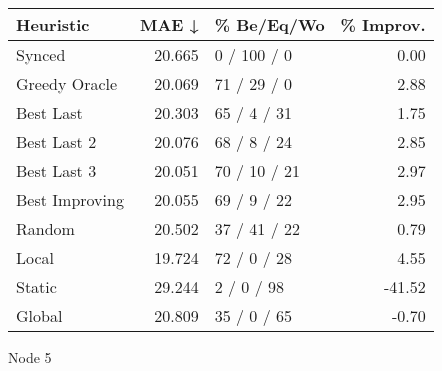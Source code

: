 \begin{tabular}{lrlr}
\toprule
\textbf{Heuristic} & \textbf{MAE ↓} & \textbf{\% Be/Eq/Wo} & \textbf{\% Improv.} \\
\midrule
            Synced &         20.665 &          0 / 100 / 0 &                0.00 \\
     Greedy Oracle &         20.069 &          71 / 29 / 0 &                2.88 \\
         Best Last &         20.303 &          65 / 4 / 31 &                1.75 \\
       Best Last 2 &         20.076 &          68 / 8 / 24 &                2.85 \\
       Best Last 3 &         20.051 &         70 / 10 / 21 &                2.97 \\
    Best Improving &         20.055 &          69 / 9 / 22 &                2.95 \\
            Random &         20.502 &         37 / 41 / 22 &                0.79 \\
             Local &         19.724 &          72 / 0 / 28 &                4.55 \\
            Static &         29.244 &           2 / 0 / 98 &              -41.52 \\
            Global &         20.809 &          35 / 0 / 65 &               -0.70 \\
\bottomrule
\end{tabular}
\caption{Node 5}
\label{tab:non_lr01_le2_bs4_5}
